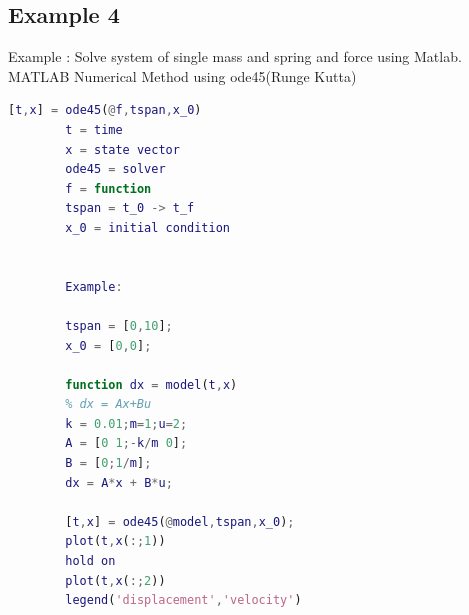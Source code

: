 \documentclass[12pt,a4paper]{article}
\begin{document}
	\subsection{Example 4}
	Example : Solve system of single mass and spring and force using Matlab. MATLAB Numerical Method using ode45(Runge Kutta)
	\begin{lstlisting}[language=MATLAB]
		[t,x] = ode45(@f,tspan,x_0)
		t = time
		x = state vector
		ode45 = solver
		f = function
		tspan = t_0 -> t_f
		x_0 = initial condition
		
		
		Example:
		
		tspan = [0,10];
		x_0 = [0,0];
		
		function dx = model(t,x)
		% dx = Ax+Bu
		k = 0.01;m=1;u=2;
		A = [0 1;-k/m 0];
		B = [0;1/m];
		dx = A*x + B*u;
		
		[t,x] = ode45(@model,tspan,x_0);
		plot(t,x(:;1))
		hold on
		plot(t,x(:;2))
		legend('displacement','velocity')
	\end{lstlisting}
	
\end{document}
